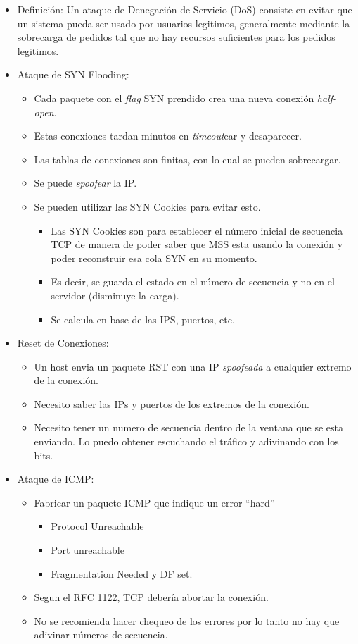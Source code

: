 \begin{itemize}
	\item Definición: Un ataque de Denegación de Servicio (DoS) consiste en evitar que un sistema pueda ser usado
	por usuarios legitimos, generalmente mediante la sobrecarga de pedidos tal que no hay recursos suficientes para
	los pedidos legitimos.
	\item Ataque de SYN Flooding: 
		\begin{itemize}
			\item Cada paquete con el \textit{flag} SYN prendido crea una nueva conexión \textit{half-open}.
			\item Estas conexiones tardan minutos en \textit{timeout}ear y desaparecer.
			\item Las tablas de conexiones son finitas, con lo cual se pueden sobrecargar.
			\item Se puede \textit{spoofear} la IP.
			\item Se pueden utilizar las SYN Cookies para evitar esto.
				\begin{itemize}
					\item Las SYN Cookies son para establecer el número inicial de secuencia TCP de manera de poder saber
					que MSS esta usando la conexión y poder reconstruir esa cola SYN en su momento.
					\item Es decir, se guarda el estado en el número de secuencia y no en el servidor (disminuye la carga).
					\item Se calcula en base de las IPS, puertos, etc.
				\end{itemize}
		\end{itemize}	
	\item Reset de Conexiones:
		\begin{itemize}
			\item Un host envia un paquete RST con una IP \textit{spoofeada} a cualquier extremo de la conexión. 
			\item Necesito saber las IPs y puertos de los extremos de la conexión.
			\item Necesito tener un numero de secuencia dentro de la ventana que se esta enviando. Lo puedo obtener
			escuchando el tráfico y adivinando con los bits.
		\end{itemize}
	\item Ataque de ICMP: 
		\begin{itemize}
			\item Fabricar un paquete ICMP que indique un error ``hard''
			\begin{itemize}
				\item Protocol Unreachable
				\item Port unreachable
				\item Fragmentation Needed y DF set.
			\end{itemize}
			\item Segun el RFC 1122, TCP debería abortar la conexión.
			\item No se recomienda hacer chequeo de los errores por lo tanto no hay que adivinar números de secuencia.
		\end{itemize}
\end{itemize}

